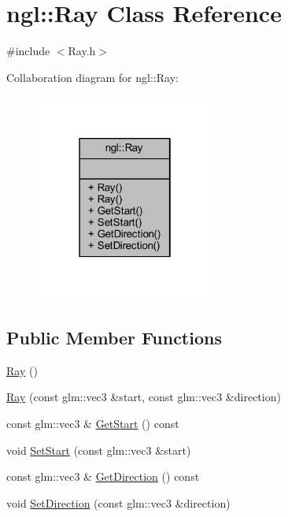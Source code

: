 \hypertarget{classngl_1_1_ray}{}\section{ngl\+:\+:Ray Class Reference}
\label{classngl_1_1_ray}


{\ttfamily \#include $<$Ray.\+h$>$}



Collaboration diagram for ngl\+:\+:Ray\+:
\nopagebreak
\begin{figure}[H]
\begin{center}
\leavevmode
\includegraphics[width=166pt]{classngl_1_1_ray__coll__graph}
\end{center}
\end{figure}
\subsection*{Public Member Functions}
\begin{DoxyCompactItemize}
\item 
\mbox{\hyperlink{classngl_1_1_ray_a4521e3bf3f7bdfc1e3215a5a901511d9}{Ray}} ()
\item 
\mbox{\hyperlink{classngl_1_1_ray_a7731d619427f23005dd82b6f96888f32}{Ray}} (const glm\+::vec3 \&start, const glm\+::vec3 \&direction)
\item 
const glm\+::vec3 \& \mbox{\hyperlink{classngl_1_1_ray_ad981f9e5a16d05f42894fba9513a5fcd}{Get\+Start}} () const
\item 
void \mbox{\hyperlink{classngl_1_1_ray_a692e697cfb4eea3cb43bee9fb99efa52}{Set\+Start}} (const glm\+::vec3 \&start)
\item 
const glm\+::vec3 \& \mbox{\hyperlink{classngl_1_1_ray_afaa6a7f1af5c55d587db215b3fc48cc4}{Get\+Direction}} () const
\item 
void \mbox{\hyperlink{classngl_1_1_ray_aec6e9aacc41803389e39fa585ad82cde}{Set\+Direction}} (const glm\+::vec3 \&direction)
\end{DoxyCompactItemize}


